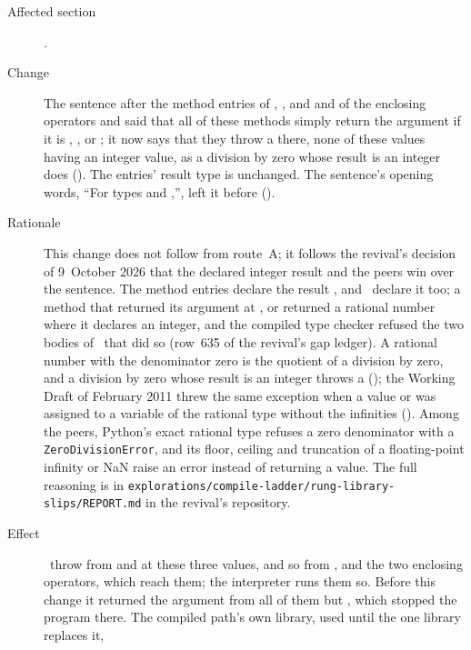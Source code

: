 \begin{description}
\item[Affected section] .
\item[Change] The sentence after the method entries of , ,
 and  and of the enclosing operators
\EXP{\lfloor\ldots\rfloor} and \EXP{\lceil\ldots\rceil} said that all of these
methods simply return the argument if it is \EXP{+\infty}, \EXP{-\infty}, or
; it now says that they throw a  there, none of
these values having an integer value, as a division by zero whose result is an
integer does ().
The entries' result type  is unchanged.
The sentence's opening words, ``For types  and
,'', left it before ().
\item[Rationale] This change does not follow from route~A; it follows the
revival's decision of 9~October 2026 that the declared integer result and the
peers win over the sentence.
The method entries declare the result , and \library\ declare
it too; a method that returned its argument at \EXP{+\infty}, \EXP{-\infty} or
 returned a rational number where it declares an integer, and the
compiled type checker refused the two bodies of \library\ that did so (row~635
of the revival's gap ledger).
A rational number with the denominator zero is the quotient of a division by
zero, and a division by zero whose result is an integer throws a
 (); the Working Draft of February 2011 threw the same
exception when a value  or  was assigned to a variable of the
rational type without the infinities ().
Among the peers, Python's exact rational type refuses a zero denominator with a
\texttt{ZeroDivisionError}, and its floor, ceiling and truncation of a
floating-point infinity or NaN raise an error instead of returning a value.
The full reasoning is in
\nolinkurl{explorations/compile-ladder/rung-library-slips/REPORT.md}
in the revival's repository.
\item[Effect] \Library\ throw  from  and
 at these three values, and so from ,  and
the two enclosing operators, which reach them; the interpreter runs them so.
Before this change it returned the argument from all of them but ,
which stopped the program there.
The compiled path's own library, used until the one library replaces it,

\end{description}
